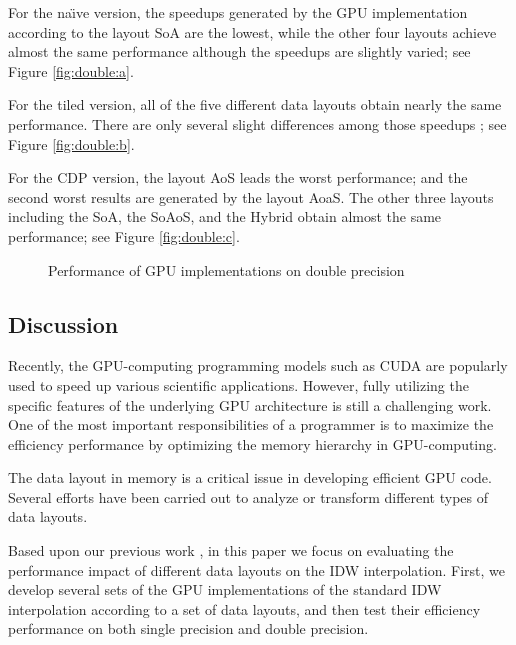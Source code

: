 For the na\"{\i}ve version, the speedups generated by the GPU implementation 
according to the layout SoA are the lowest, while the other four layouts 
achieve almost the same performance although the speedups are slightly 
varied; see Figure \ref{fig:double:a}.

For the tiled version, all of the five different data layouts obtain nearly the 
same performance. There are only several slight differences among those speedups 
; see Figure \ref{fig:double:b}.


For the CDP version, the layout AoS leads the worst performance; and the 
second worst results are generated by the layout AoaS. The other three 
layouts including the SoA, the SoAoS, and the Hybrid obtain almost the same 
performance; see Figure \ref{fig:double:c}.

\begin{figure}[htb]
\centering
{}
\hspace{1em}
\hspace{1em}
\caption{Performance of GPU implementations on double precision}
\label{fig:double}       \end{figure}

\subsection{Discussion}
\label{sec:discussion}

Recently, the GPU-computing programming models such as CUDA are popularly 
used to speed up various scientific applications. However, fully utilizing 
the specific features of the underlying GPU architecture is still a 
challenging work. One of the most important responsibilities of a programmer 
is to maximize the efficiency performance by optimizing the memory hierarchy 
in GPU-computing. 

The data layout in memory is a critical issue in developing efficient GPU 
code. Several efforts have been carried out to analyze \cite{giles2013,siegel2009,strzodka2012} or 
transform \cite{mistry2011,strzodka2011,sung2012} different types of data layouts.


Based upon our previous work \cite{mei2014}, in this paper we focus on evaluating 
the performance impact of different data layouts on the IDW interpolation. 
First, we develop several sets of the GPU implementations of the standard 
IDW interpolation according to a set of data layouts, and then test their 
efficiency performance on both single precision and double precision. 

